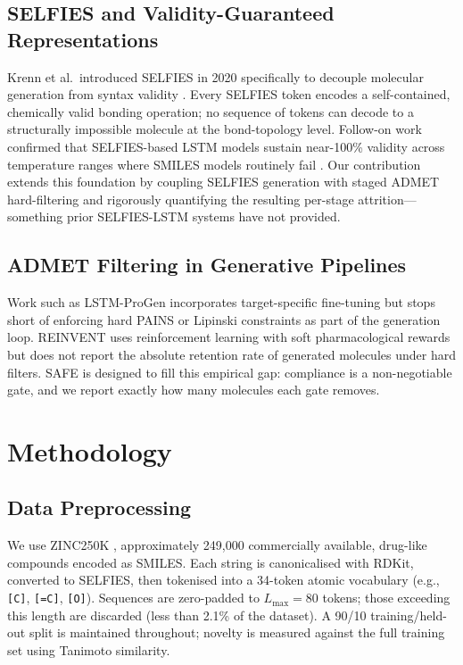 \documentclass[conference]{IEEEtran}
\begin{document}
\subsection{SELFIES and Validity-Guaranteed Representations}

Krenn et al.\ introduced SELFIES in 2020 specifically to decouple molecular generation from syntax validity \cite{ref9}. Every SELFIES token encodes a self-contained, chemically valid bonding operation; no sequence of tokens can decode to a structurally impossible molecule at the bond-topology level. Follow-on work confirmed that SELFIES-based LSTM models sustain near-100\% validity across temperature ranges where SMILES models routinely fail \cite{ref10}. Our contribution extends this foundation by coupling SELFIES generation with staged ADMET hard-filtering and rigorously quantifying the resulting per-stage attrition---something prior SELFIES-LSTM systems have not provided.

\subsection{ADMET Filtering in Generative Pipelines}

Work such as LSTM-ProGen \cite{ref9} incorporates target-specific fine-tuning but stops short of enforcing hard PAINS or Lipinski constraints as part of the generation loop. REINVENT \cite{ref2} uses reinforcement learning with soft pharmacological rewards but does not report the absolute retention rate of generated molecules under hard filters. SAFE is designed to fill this empirical gap: compliance is a non-negotiable gate, and we report exactly how many molecules each gate removes.


\section{Methodology}

\subsection{Data Preprocessing}

We use ZINC250K \cite{ref14}, approximately 249,000 commercially available, drug-like compounds encoded as SMILES. Each string is canonicalised with RDKit, converted to SELFIES, then tokenised into a 34-token atomic vocabulary (e.g., \texttt{[C]}, \texttt{[=C]}, \texttt{[O]}). Sequences are zero-padded to $L_{\max} = 80$ tokens; those exceeding this length are discarded (less than 2.1\% of the dataset). A 90/10 training/held-out split is maintained throughout; novelty is measured against the full training set using Tanimoto similarity.
\end{document}
